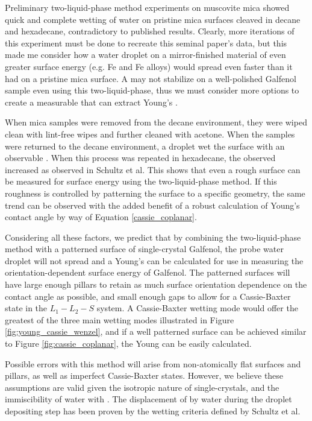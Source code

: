 Preliminary two-liquid-phase method experiments on muscovite mica showed quick and complete wetting of water on pristine mica surfaces cleaved in decane and hexadecane, contradictory to published results.\cite{Schultz1992} Clearly, more iterations of this experiment must be done to recreate this seminal paper's data, but this made me consider how a water droplet on a mirror-finished material of even greater surface energy (e.g. Fe and Fe alloys) would spread even faster than it had on a pristine mica surface. A \ca may not stabilize on a well-polished Galfenol sample even using this two-liquid-phase, thus we must consider more options to create a measurable \ca that can extract Young's \ca. 

When mica samples were removed from the decane environment, they were wiped clean with lint-free wipes and further cleaned with acetone. When the samples were returned to the decane environment, a droplet wet the surface with an observable \ca. When this process was repeated in hexadecane, the observed \ca increased as observed in Schultz et al. This shows that even a rough surface can be measured for surface energy using the two-liquid-phase method. If this roughness is controlled by patterning the surface to a specific geometry, the same trend can be observed with the added benefit of a robust calculation of Young's contact angle by way of Equation \ref{cassie_coplanar}. 

Considering all these factors, we predict that by combining the two-liquid-phase method with a patterned surface of single-crystal Galfenol, the probe water droplet will not spread and a Young's \ca can be calculated for use in measuring the orientation-dependent surface energy of Galfenol. The patterned surfaces will have large enough pillars to retain as much surface orientation dependence on the contact angle as possible, and small enough gaps to allow for a Cassie-Baxter state in the $ L_1-L_2-S $ system. A Cassie-Baxter wetting mode would offer the greatest \ca of the three main wetting modes illustrated in Figure \ref{fig:young_cassie_wenzel}, and if a well patterned surface can be achieved similar to Figure \ref{fig:cassie_coplanar}, the Young \ca can be easily calculated. 

Possible errors with this method will arise from non-atomically flat surfaces and pillars, as well as imperfect Cassie-Baxter states. However, we believe these assumptions are valid given the isotropic nature of single-crystals, and the immiscibility of water with \nalk[s]. The displacement of \nalk[s] by water during the droplet depositing step has been proven by the wetting criteria defined by Schultz et al.\cite{Schultz1992,Giljean2011}

